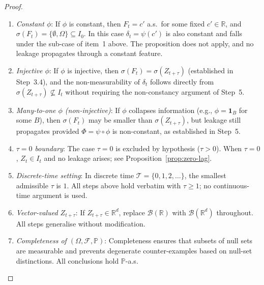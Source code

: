 \documentclass[12pt,openany]{book}
\newcommand{\calF}{\mathcal{F}}
\newcommand{\calI}{\mathcal{I}}
\numberwithin{equation}{chapter}
\theoremstyle{plain}
\theoremstyle{definition}
\theoremstyle{remark}
\numberwithin{equation}{chapter}
\theoremstyle{plain}
\def\calI{I}%
\begin{document}
\begin{proof}
\begin{enumerate}
  \item \emph{Constant $\phi$}: If $\phi$ is constant, then
        $F_t = c'$ a.s.\ for some fixed $c' \in \mathbb{R}$,
        and $\sigma(F_t) = \{\emptyset, \Omega\} \subseteq \calI_0$.
        In this case $\delta_t = \psi(c')$ is also constant and
        falls under the sub-case of item~1 above.  The
        proposition does not apply, and no leakage propagates
        through a constant feature.

  \item \emph{Injective $\phi$}: If $\phi$ is injective, then
        $\sigma(F_t) = \sigma(Z_{t+\tau})$ (established in
        Step~3.4), and the non-measurability of $\delta_t$
        follows directly from $\sigma(Z_{t+\tau})
        \not\subseteq \calI_t$ without requiring the
        non-constancy argument of Step~5.

  \item \emph{Many-to-one $\phi$ (non-injective)}: If $\phi$
        collapses information (e.g., $\phi = \mathbf{1}_{B}$
        for some $B$), then $\sigma(F_t)$ may be smaller
        than $\sigma(Z_{t+\tau})$, but leakage still
        propagates provided $\Phi = \psi \circ \phi$ is
        non-constant, as established in Step~5.

  \item \emph{$\tau = 0$ boundary}: The case $\tau = 0$
        is excluded by hypothesis ($\tau > 0$).  When
        $\tau = 0$, $Z_t \in \calI_t$ and no leakage
        arises; see Proposition~\ref{prop:zero-lag}.

  \item \emph{Discrete-time setting}: In discrete time
        $\mathcal{T} = \{0, 1, 2, \ldots\}$, the smallest
        admissible $\tau$ is $1$.  All steps above hold
        verbatim with $\tau \geq 1$; no continuous-time
        argument is used.

  \item \emph{Vector-valued $Z_{t+\tau}$}: If
        $Z_{t+\tau} \in \mathbb{R}^d$, replace
        $\mathcal{B}(\mathbb{R})$ with
        $\mathcal{B}(\mathbb{R}^d)$ throughout.  All
        steps generalise without modification.

  \item \emph{Completeness of $(\Omega,\calF,\mathbb{P})$}:
        Completeness ensures that subsets of null sets are
        measurable and prevents degenerate counter-examples
        based on null-set distinctions.  All conclusions
        hold $\mathbb{P}$-a.s.
\end{enumerate}


\end{proof}
\end{document}
